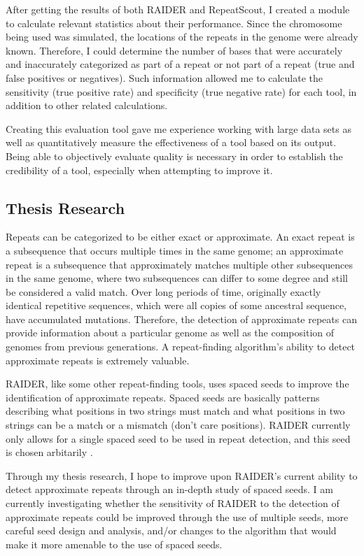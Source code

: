 After getting the results of both RAIDER and RepeatScout, I created a module to calculate relevant statistics about their performance. Since the chromosome being used was simulated, the locations of the repeats in the genome were already known. Therefore, I could determine the number of bases that were accurately and inaccurately categorized as part of a repeat or not part of a repeat (true and false positives or negatives). Such information allowed me to calculate the sensitivity (true positive rate) and specificity (true negative rate) for each tool, in addition to other related calculations.

Creating this evaluation tool gave me experience working with large data sets as well as quantitatively measure the effectiveness of a tool based on its output. Being able to objectively evaluate quality is necessary in order to establish the credibility of a tool, especially when attempting to improve it.

\subsection{Thesis Research}
Repeats can be categorized to be either exact or approximate. An exact repeat is a subsequence that occurs multiple times in the same genome; an approximate repeat is a subsequence that approximately matches multiple other subsequences in the same genome, where two subsequences can differ to some degree and still be considered a valid match. Over long periods of time, originally exactly identical repetitive sequences, which were all copies of some ancestral sequence, have accumulated mutations. Therefore, the detection of approximate repeats can provide information about a particular genome as well as the composition of genomes from previous generations. A repeat-finding algorithm's ability to detect approximate repeats is extremely valuable.

RAIDER, like some other repeat-finding tools, uses spaced seeds to improve the identification of approximate repeats. Spaced seeds are basically patterns describing what positions in two strings must match and what positions in two strings can be a match or a mismatch (don't care positions). RAIDER currently only allows for a single spaced seed to be used in repeat detection, and this seed is chosen arbitarily \cite{figueroa2013raiderpaper}.

Through my thesis research, I hope to improve upon RAIDER's current ability to detect approximate repeats through an in-depth study of spaced seeds. I am currently investigating whether the sensitivity of RAIDER to the detection of approximate repeats could be improved through the use of multiple seeds, more careful seed design and analysis, and/or changes to the algorithm that would make it more amenable to the use of spaced seeds. 
